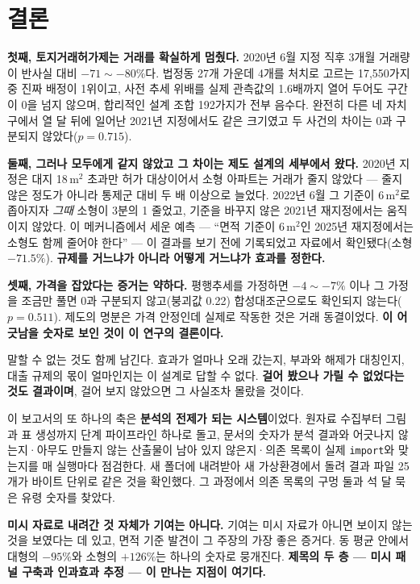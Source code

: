 
\section{결론}

\textbf{첫째, 토지거래허가제는 거래를 확실하게 멈췄다.} 2020년 6월 지정 직후
3개월 거래량이 반사실 대비 $-71 \sim -80\%$다. 법정동 27개 가운데 4개를 처치로
고르는 17,550가지 중 진짜 배정이 1위이고, 사전 추세 위배를 실제 관측값의
1.6배까지 열어 두어도 구간이 0을 넘지 않으며, 합리적인 설계 조합 192가지가 전부
음수다. 완전히 다른 네 자치구에서 열 달 뒤에 일어난 2021년 지정에서도 같은
크기였고 두 사건의 차이는 0과 구분되지 않았다($p=0.715$).

\textbf{둘째, 그러나 모두에게 같지 않았고 그 차이는 제도 설계의 세부에서 왔다.}
2020년 지정은 대지 18\,m$^2$ 초과만 허가 대상이어서 소형 아파트는 거래가 줄지
않았다 --- 줄지 않은 정도가 아니라 통제군 대비 두 배 이상으로 늘었다. 2022년 6월
그 기준이 6\,m$^2$로 좁아지자 \emph{그때} 소형이 3분의 1 줄었고, 기준을 바꾸지
않은 2021년 재지정에서는 움직이지 않았다. 이 메커니즘에서 세운 예측 ---
``면적 기준이 6\,m$^2$인 2025년 재지정에서는 소형도 함께 줄어야 한다'' --- 이
결과를 보기 전에 기록되었고 자료에서 확인됐다(소형 $-71.5\%$).
\textbf{규제를 거느냐가 아니라 어떻게 거느냐가 효과를 정한다.}

\textbf{셋째, 가격을 잡았다는 증거는 약하다.} 평행추세를 가정하면 $-4 \sim -7\%$
이나 그 가정을 조금만 풀면 0과 구분되지 않고(붕괴값 0.22) 합성대조군으로도
확인되지 않는다($p=0.511$). 제도의 명분은 가격 안정인데 실제로 작동한 것은 거래
동결이었다. \textbf{이 어긋남을 숫자로 보인 것이 이 연구의 결론이다.}

\vspace{1em}

말할 수 없는 것도 함께 남긴다. 효과가 얼마나 오래 갔는지, 부과와 해제가 대칭인지,
대출 규제의 몫이 얼마인지는 이 설계로 답할 수 없다. \textbf{걸어 봤으나 가릴 수
없었다는 것도 결과이며}, 걸어 보지 않았으면 그 사실조차 몰랐을 것이다.

이 보고서의 또 하나의 축은 \textbf{분석의 전제가 되는 시스템}이었다. 원자료
수집부터 그림과 표 생성까지 \pipeSteps 단계 파이프라인 하나로 돌고, 문서의 숫자가 분석
결과와 어긋나지 않는지·아무도 만들지 않는 산출물이 남아 있지 않은지·의존 목록이
실제 \texttt{import}와 맞는지를 매 실행마다 점검한다. 새 폴더에 내려받아 새
가상환경에서 돌려 결과 파일 25개가 바이트 단위로 같은 것을 확인했다. 그 과정에서
의존 목록의 구멍 둘과 석 달 묵은 유령 숫자를 찾았다.

\textbf{미시 자료로 내려간 것 자체가 기여는 아니다.} 기여는 미시 자료가 아니면
보이지 않는 것을 보였다는 데 있고, 면적 기준 발견이 그 주장의 가장 좋은 증거다.
동 평균 안에서 대형의 $-95\%$와 소형의 $+126\%$는 하나의 숫자로 뭉개진다.
\textbf{제목의 두 층 --- 미시 패널 구축과 인과효과 추정 --- 이 만나는 지점이
여기다.}
